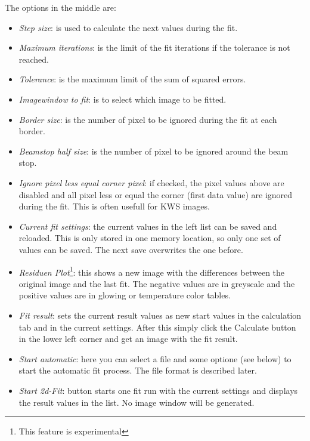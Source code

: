 \documentclass[11pt]{article} %
\begin{document}
The options in the middle are:
\begin{itemize}\itemsep0pt
\item {\it Step size}: is used to calculate the next values during the fit.
\item {\it Maximum iterations}: is the limit of the fit iterations if the tolerance is not reached.
\item {\it Tolerance}: is the maximum limit of the sum of squared errors.
\item {\it Imagewindow to fit}: is to select which image to be fitted.
\item {\it Border size}: is the number of pixel to be ignored during the fit at each border.
\item {\it Beamstop half size}: is the number of pixel to be ignored around the beam stop.
\item {\it Ignore pixel less equal corner pixel}: if checked, the pixel values above are disabled and all pixel less or equal the corner (first data value) are ignored during the fit. This is often usefull for KWS images.
\item {\it Current fit settings}: the current values in the left list can be saved and reloaded. This is only stored in one memory location, so only one set of values can be saved. The next save overwrites the one before.
\item {\it Residuen Plot}\footnote{This feature is experimental}: this shows a new image with the differences between the original image and the last fit. The negative values are in greyscale and the positive values are in glowing or temperature color tables.
\item {\it Fit result}: sets the current result values as new start values in the calculation tab and in the current settings. After this simply click the Calculate button in the lower left corner and get an image with the fit result.
\item {\it Start automatic}: here you can select a file and some optione (see below) to start the automatic fit process. The file format is described later.
\item {\it Start 2d-Fit}: button starts one fit run with the current settings and displays the result values in the list. No image window will be generated.
\end{itemize}
\end{document}
